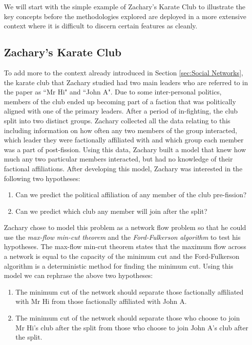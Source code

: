 We will start with the simple example of Zachary's Karate Club to illustrate the key concepts before the methodologies explored are deployed in a more extensive context where it is difficult to discern certain features as cleanly.

\subsection{Zachary's Karate Club}\label{sec:zachary_section}
To add more to the context already introduced in Section \ref{sec:Social Networks}, the karate club that Zachary studied had two main leaders who are referred to in the paper as ``Mr Hi" and ``John A". Due to some inter-personal politics, members of the club ended up becoming part of a faction that was politically aligned with one of the primary leaders. After a period of in-fighting, the club split into two distinct groups. Zachary collected all the data relating to this including information on how often any two members of the group interacted, which leader they were factionally affiliated with and which group each member was a part of post-fission. Using this data, Zachary built a model that knew how much any two particular members interacted, but had no knowledge of their factional affiliations. After developing this model, Zachary was interested in the following two hypotheses:

\begin{enumerate}
    \item Can we predict the political affiliation of any member of the club pre-fission?
    \item Can we predict which club any member will join after the split?
\end{enumerate}

\noindent
Zachary chose to model this problem as a network flow problem so that he could use the \emph{max-flow min-cut theorem} and the \emph{Ford-Fulkerson algorithm} \cite{ford_fulkerson_1956} to test his hypotheses. The max-flow min-cut theorem states that the maximum flow across a network is equal to the capacity of the minimum cut and the Ford-Fulkerson algorithm is a deterministic method for finding the minimum cut. Using this model we can rephrase the above two hypotheses:

\begin{enumerate}
    \item The minimum cut of the network should separate those factionally affiliated with Mr Hi from those factionally affiliated with John A.
    \item The minimum cut of the network should separate those who choose to join Mr Hi's club after the split from those who choose to join John A's club after the split.
\end{enumerate}


